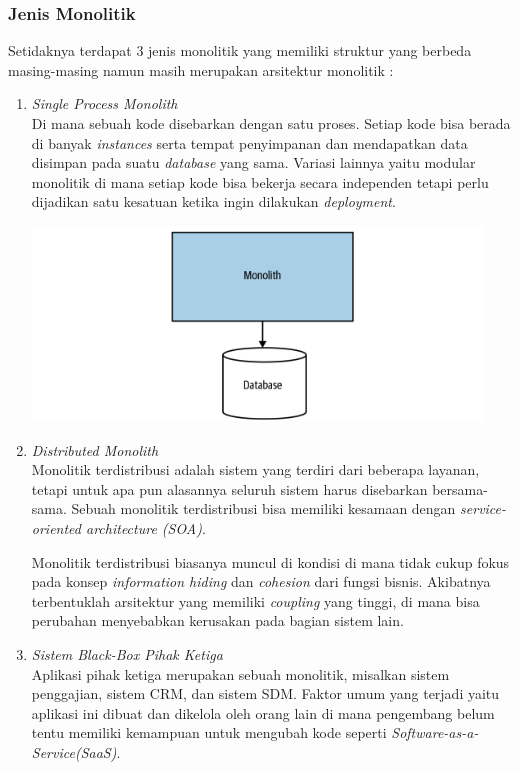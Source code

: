 \subsubsection{Jenis Monolitik}
Setidaknya terdapat 3 jenis monolitik yang memiliki struktur yang berbeda masing-masing namun masih merupakan arsitektur monolitik \cite{74C}:
\begin{enumerate}[leftmargin=1.3cm]
\item \textit{Single Process Monolith}\\
Di mana sebuah kode disebarkan dengan satu proses. Setiap kode bisa berada di banyak \textit{instances} serta tempat penyimpanan dan mendapatkan data disimpan pada suatu \textit{database} yang sama. Variasi lainnya yaitu modular monolitik di mana setiap kode bisa bekerja secara independen tetapi perlu dijadikan satu kesatuan ketika ingin dilakukan \textit{deployment}.
\begin{center}
	\includegraphics[width=12cm]{img/bab_2/sp_mono.png}
	\label{fig:msa}
\end{center}
\item \textit{Distributed Monolith}\\
Monolitik terdistribusi adalah sistem yang terdiri dari beberapa layanan, tetapi untuk apa pun alasannya seluruh sistem harus disebarkan bersama-sama. Sebuah monolitik terdistribusi bisa memiliki kesamaan dengan \textit{service-oriented architecture (SOA)}.

Monolitik terdistribusi biasanya muncul  di kondisi di mana tidak cukup fokus pada konsep \textit{information hiding} dan \textit{cohesion} dari fungsi bisnis. Akibatnya terbentuklah arsitektur yang memiliki \textit{coupling} yang tinggi, di mana bisa perubahan menyebabkan kerusakan pada bagian sistem lain.
\item \textit{Sistem Black-Box Pihak Ketiga}\\
Aplikasi pihak ketiga merupakan sebuah monolitik, misalkan sistem penggajian, sistem CRM, dan sistem SDM. Faktor umum yang terjadi yaitu aplikasi ini dibuat dan dikelola oleh orang lain di mana pengembang belum tentu memiliki kemampuan untuk mengubah kode seperti \textit{Software-as-a-Service(SaaS)}.
\end{enumerate}

